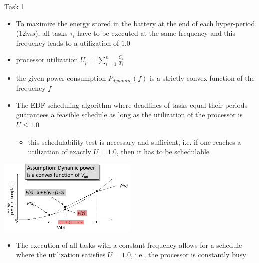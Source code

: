 \begin{frame}[allowframebreaks]{Task 1}{}
\begin{solution}
  \end{solution}
  \framebreak
  \begin{tasknoinc}
    \begin{itemize}
      \item To maximize the energy stored in the battery at the end of each hyper-period ($12 ms$), all tasks $ \tau_i$ have to be executed at the same frequency and this frequency leads to a utilization of $1.0$
    \end{itemize}
  \end{tasknoinc}
  \framebreak
  \begin{requirementsnoinc}
    \begin{itemize}
      \item \alert{processor utilization} $\displaystyle U_p = \sum_{i=1}^n \frac{C_i}{T_i}$
      \item the given power consumption $P_{dynamic}(f)$ is a \alert{strictly convex} function of the frequency $f$
      \item The EDF scheduling algorithm where deadlines of tasks equal their periods guarantees a feasible schedule as long as the utilization of the processor is $U \le 1.0$
        \begin{itemize}
          \item this schedulability test is \alert{necessary} and \alert{sufficient}, i.e. if one reaches a utilization of exactly $U = 1.0$, then it has to be schedulable
        \end{itemize}
    \end{itemize}
  \end{requirementsnoinc}
  \begin{requirementsnoinc}
    \centering
    \includegraphics[width=0.5\textwidth]{./figures/task2_power_convex.png}
  \end{requirementsnoinc}
  \begin{solutionnoinc}
    \begin{itemize}
      \item The execution of all tasks with a constant frequency allows for a schedule where the utilization satisfies $U = 1.0$, i.e., the processor is constantly busy

\end{itemize}
\end{solutionnoinc}
\end{frame}
